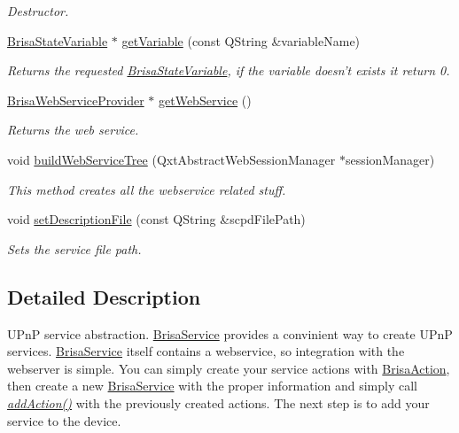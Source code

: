 \begin{DoxyCompactItemize}
\begin{DoxyCompactList}\small\item\em Destructor. \item\end{DoxyCompactList}\item 
\hyperlink{classBrisaUpnp_1_1BrisaStateVariable}{BrisaStateVariable} $\ast$ \hyperlink{classBrisaUpnp_1_1BrisaService_a46f4663b0d7bd8f9b1d22820482afc59}{getVariable} (const QString \&variableName)
\begin{DoxyCompactList}\small\item\em Returns the requested \hyperlink{classBrisaUpnp_1_1BrisaStateVariable}{BrisaStateVariable}, if the variable doesn't exists it return 0. \item\end{DoxyCompactList}\item 
\hyperlink{classBrisaCore_1_1BrisaWebServiceProvider}{BrisaWebServiceProvider} $\ast$ \hyperlink{classBrisaUpnp_1_1BrisaService_a77c97c9c86a73401441b6d8a5749ce58}{getWebService} ()
\begin{DoxyCompactList}\small\item\em Returns the web service. \item\end{DoxyCompactList}\item 
void \hyperlink{classBrisaUpnp_1_1BrisaService_ae52e9285fd603cbf7f9e7d2d73d4a8b4}{buildWebServiceTree} (QxtAbstractWebSessionManager $\ast$sessionManager)
\begin{DoxyCompactList}\small\item\em This method creates all the webservice related stuff. \item\end{DoxyCompactList}\item 
void \hyperlink{classBrisaUpnp_1_1BrisaService_ad9e2b0c98932f656aee0c4f020955f97}{setDescriptionFile} (const QString \&scpdFilePath)
\begin{DoxyCompactList}\small\item\em Sets the service file path. \item\end{DoxyCompactList}\end{DoxyCompactItemize}


\subsection{Detailed Description}
UPnP service abstraction. \hyperlink{classBrisaUpnp_1_1BrisaService}{BrisaService} provides a convinient way to create UPnP services. \hyperlink{classBrisaUpnp_1_1BrisaService}{BrisaService} itself contains a webservice, so integration with the webserver is simple. You can simply create your service actions with \hyperlink{classBrisaUpnp_1_1BrisaAction}{BrisaAction}, then create a new \hyperlink{classBrisaUpnp_1_1BrisaService}{BrisaService} with the proper information and simply call {\itshape \hyperlink{classBrisaUpnp_1_1BrisaAbstractService_a628800df3aed5b953316bb8e55257ea5}{addAction()}\/} with the previously created actions. The next step is to add your service to the device. 

